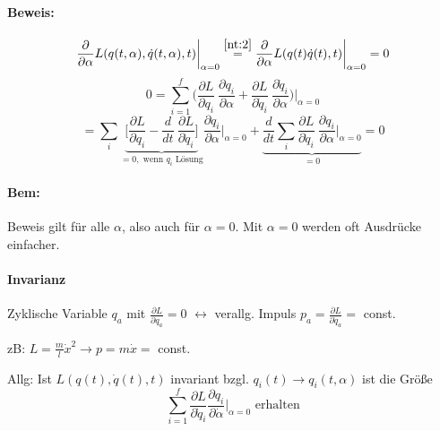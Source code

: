 \documentclass[titlepage,12pt,a4paper,ngerman]{report}
\newcommand{\tx}[1]{\textrm{#1}}
\newcommand{\summ}[2]{\sum_{#1}^{#2}}
\begin{document}
{\paragraph{Beweis:}
$$\frac{\partial}{\partial \alpha}L(q(t,\alpha), \dot q(t, \alpha),t)\bigg|_{\alpha=0} \buildrel \ref{nt:2} \over = \frac{\partial}{\partial \alpha}L(q(t)\dot q(t),t)\bigg|_{\alpha=0} = 0$$
$$0 = \summ{i=1}{f}\bigg(\frac{\partial L}{\partial q_i}\ \frac{\partial q_i}{\partial \alpha} + \frac{\partial L}{\partial \dot q_i}\ \frac{\partial \dot q_i}{\partial \alpha}\bigg) \bigg|_{\alpha=0}$$
$$= \sum_i \underbrace{\bigg[\frac{\partial L}{\partial q_i} - \frac{d}{dt} \ \frac{\partial L}{\partial \dot q_i} \bigg]}_{= 0, \tx{ wenn $q_i$ Lösung}} \frac{\partial q_i}{\partial \alpha}\bigg|_{\alpha=0} + \underbrace{\frac{d}{dt} \sum_i \frac{\partial L}{\partial \dot q_i}\ \frac{\partial q_i}{\partial \alpha}\bigg|_{\alpha=0}}_{= 0} = 0$$
\paragraph{Bem:} Beweis gilt für alle $\alpha$, also auch für $\alpha = 0$. Mit $\alpha = 0$ werden oft Ausdrücke einfacher.


\paragraph{Invarianz}
\begin{trivlist}
	\item Zyklische Variable $q_a$ mit $\frac{\partial L}{\partial q_a}= 0 $ $\leftrightarrow$ verallg. Impuls $p_a = \frac{\partial L}{\partial \dot q_a} = $ const.
	\item zB: $L = \frac{m}{l}\dot x^2 \rightarrow p = m \dot x = $ const.
	\item Allg: Ist $L(q(t), \dot q(t), t)$ invariant bzgl. $q_i (t) \rightarrow q_i (t, \alpha)$ ist die Größe $$\summ{i = 1}{f} \frac{\partial L}{\partial \dot q_i} \frac{\partial q_i}{\partial \dot \alpha} \bigg|_{\alpha = 0} \tx{ erhalten}$$
\end{trivlist}
}
\end{document}
